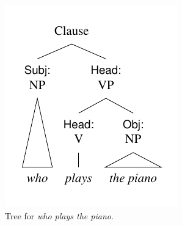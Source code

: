 \begin{figure}[htbp]
  \centering
  \begin{subfigure}[b]{0.48\textwidth}
    \centering
    \includegraphics[width=.75\textwidth]{figures/who-plays-tree.pdf}
    \caption{Tree for \textit{who plays the piano}.}
    \label{fig:who-plays}
  \end{subfigure}
  \hfill
  \begin{subfigure}[b]{0.48\textwidth}
    \centering

\end{subfigure}
\end{figure}
